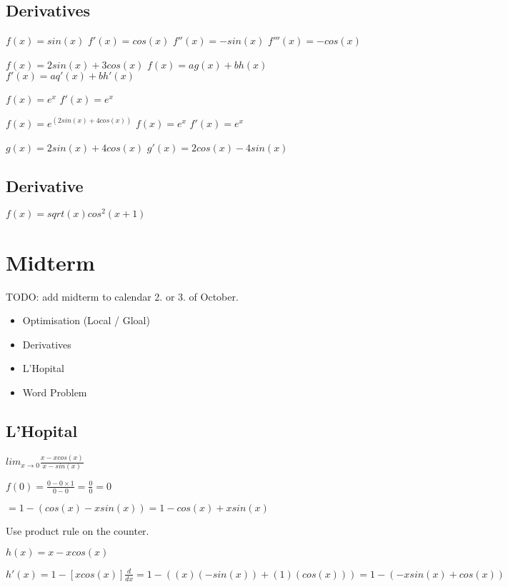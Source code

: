 \documentclass[12pt,a4paper]{article}
\begin{document}
\subsection*{Derivatives}

$f(x)= sin(x)$
$f'(x)= cos(x)$
$f''(x)= -sin(x)$
$f'''(x)= -cos(x)$


$f(x) = 2sin(x) + 3cos(x)$
$f(x) = ag(x) + bh(x)$
$f'(x) = aq'(x) + bh'(x)$

$f(x) = e^x$
$f'(x) = e^x$

$f(x) = e^(2sin(x) + 4cos(x))$
$f(x) = e^x$
$f'(x) = e^x$

$g(x) = 2sin(x) + 4cos(x)$
$g'(x) = 2cos(x) - 4sin(x)$


\subsection*{Derivative}

$f(x) = sqrt(x)cos^2(x + 1)$


\section*{Midterm}

TODO: add midterm to calendar 2. or 3. of October.

\begin{itemize}
    \item Optimisation (Local / Gloal)
    \item Derivatives
    \item L'Hopital
    \item Word Problem
\end{itemize}

\newpage

\subsection*{L'Hopital}

$lim_{x \to 0} \frac{x-xcos(x)}{x-sin(x)}$

\noindent $f(0) = \frac{0 - 0 \times 1}{0 - 0} = \frac{0}{0} = 0$

\noindent $= 1 - (cos(x)-xsin(x)) = 1 - cos(x) + xsin(x)$

\noindent Use product rule on the counter.

\noindent $h(x) = x - xcos(x)$

\noindent $h'(x) = 1 - [xcos(x)]\frac{d}{dx} = 1 - ((x)(-sin(x)) + (1)(cos(x))) = 1 - (-xsin(x)+cos(x))$
\end{document}
